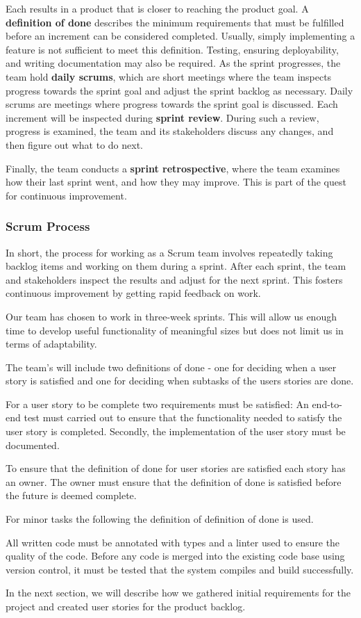 Each results in a product that is closer to reaching the product goal.
A \textbf{definition of done} describes the minimum requirements that must be fulfilled before an increment can be considered completed.
Usually, simply implementing a feature is not sufficient to meet this definition.
Testing, ensuring deployability, and writing documentation may also be required.
As the sprint progresses, the team hold \textbf{daily scrums}, which are short meetings where the team inspects progress towards the sprint goal and adjust the sprint backlog as necessary.
Daily scrums are meetings where progress towards the sprint goal is discussed.
Each increment will be inspected during \textbf{sprint review}.
During such a review, progress is examined, the team and its stakeholders discuss any changes, and then figure out what to do next.

Finally, the team conducts a \textbf{sprint retrospective}, where the team examines how their last sprint went, and how they may improve.
This is part of the quest for continuous improvement.\cite{sutherlandScrumArtDoing2014}

\subsubsection*{Scrum Process}
In short, the process for working as a Scrum team involves repeatedly taking backlog items and working on them during a sprint.
After each sprint, the team and stakeholders inspect the results and adjust for the next sprint.
This fosters continuous improvement by getting rapid feedback on work.

Our team has chosen to work in three-week sprints.
This will allow us enough time to develop useful functionality of meaningful sizes but does not limit us in terms of adaptability.

The team's will include two definitions of done - one for deciding when a user story is satisfied and one for deciding when subtasks of the users stories are done.
\begin{dod}
    For a user story to be complete two requirements must be satisfied: An end-to-end test must carried out to ensure that the functionality needed to satisfy the user story is completed. Secondly, the implementation of the user story must be documented. 
\end{dod}
To ensure that the definition of done for user stories are satisfied each story has an owner. 
The owner must ensure that the definition of done is satisfied before the future is deemed complete.

For minor tasks the following the definition of definition of done is used. 
\begin{dod}
    All written code must be annotated with types and a linter used to ensure the quality of the code.
    Before any code is merged into the existing code base using version control, it must be tested that the system compiles and build successfully.  
\end{dod}

In the next section, we will describe how we gathered initial requirements for the project and created user stories for the product backlog.